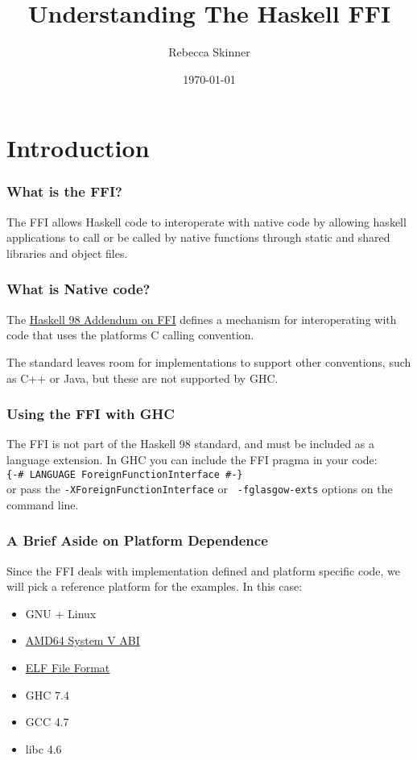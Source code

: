 \documentclass{beamer}
\title{Understanding The Haskell FFI}
\author{Rebecca Skinner}
\institute{rebecca@rebeccaskinner.net}
\date{\today}
\newcommand{\chref}[3] {
    {\color{#1} \href{#2}{\underline{#3}}}
}
\begin{document}
\begin{frame}
    \titlepage
\end{frame}

\section{Introduction}
\begin{frame}
    \frametitle{What is the FFI?}

    The FFI allows Haskell code to interoperate with native code by allowing
    haskell applications to call or be called by native functions through
    static and shared libraries and object files.

\end{frame}

\begin{frame}
    \frametitle{What is Native code?}

    The \chref{darkgray}
    {http://www.cse.unsw.edu.au/~chak/haskell/ffi/ffi/ffi.html} {Haskell 98
    Addendum on FFI} defines a mechanism for interoperating with code that uses
    the platforms C calling convention.

    The standard leaves room for implementations to support other conventions,
    such as C++ or Java, but these are not supported by GHC.
\end{frame}

\begin{frame}
    \frametitle{Using the FFI with GHC}

    The FFI is not part of the Haskell 98 standard, and must be included as a
    language extension.  In GHC you can include the FFI pragma in your code: \\
    \vspace{2mm} {\tt \{-\# LANGUAGE ForeignFunctionInterface \#-\}} \\
    \vspace{2mm} or pass the {\tt -XForeignFunctionInterface} or {\tt
    -fglasgow-exts} options on the command line.
\end{frame}

\begin{frame}
    \frametitle{A Brief Aside on Platform Dependence}

    Since the FFI deals with implementation defined and platform specific code,
    we will pick a reference platform for the examples.  In this case:

    \begin{itemize}
        \item {GNU + Linux}
        \item {\chref{darkgray}{http://www.uclibc.org/docs/psABI-x86_64.pdf}{AMD64 System V ABI}}
        \item {\chref{darkgray}{http://www.skyfree.org/linux/references/ELF_Format.pdf}{ELF File Format}}
        \item {GHC 7.4}
        \item {GCC 4.7}
        \item {libc 4.6}
    \end{itemize}
\end{frame}
\end{document}
